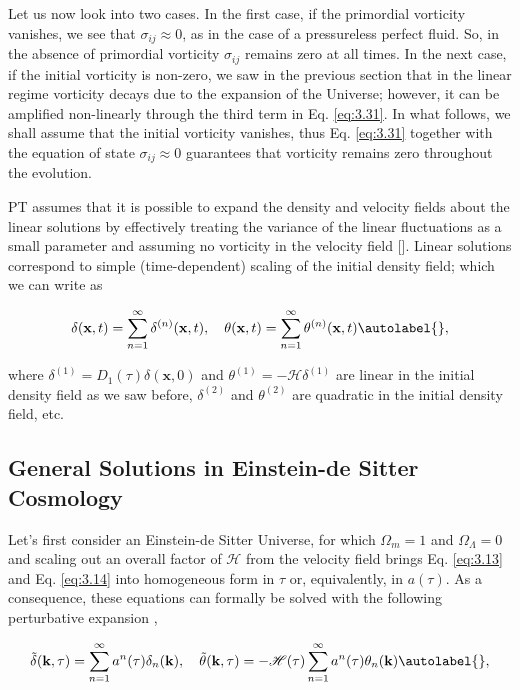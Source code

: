 Let us now look into two cases. In the first case, if the primordial vorticity vanishes, we see that $\sigma_{i j} \approx 0$, as in the case of a pressureless perfect fluid. So, in the absence of primordial vorticity $\sigma_{i j}$ remains zero at all times. In the next case, if the initial vorticity is non-zero, we saw in the previous section that in the linear regime vorticity decays due to the expansion of the Universe; however, it can be amplified non-linearly through the third term in Eq. \eqref{eq:3.31}. In what follows, we shall assume that the initial vorticity vanishes, thus Eq. \eqref{eq:3.31} together with the equation of state $\sigma_{i j} \approx 0$ guarantees that vorticity remains zero throughout the evolution.

PT assumes that it is possible to expand the density and velocity fields about the linear solutions by effectively treating the variance of the linear fluctuations as a small parameter and assuming no vorticity in the velocity field [\cite{Dodelson}\cite{Bernardeau_2002}]. Linear solutions correspond to simple (time-dependent) scaling of the initial density field; which we can write as

\begin{equation}
    \delta(\mathbf{x}, t)=\sum_{n=1}^{\infty} \delta^{(n)}(\mathbf{x}, t), \quad \theta(\mathbf{x}, t)=\sum_{n=1}^{\infty} \theta^{(n)}(\mathbf{x}, t) \autolabel{},
\end{equation}


where $\delta^{(1)}=D_{1}(\tau) \delta(\mathbf{x}, 0)$ and $\theta^{(1)} = -\mathcal{H}\delta^{(1)}$ are linear in the initial density field as we saw before, $\delta^{(2)}$ and $\theta^{(2)}$ are quadratic in the initial density field, etc.

\subsection{General Solutions in Einstein-de Sitter Cosmology}
Let's first consider an Einstein-de Sitter Universe, for which $\Omega_{m}=1$ and $\Omega_{\Lambda}=0$ and scaling out an overall factor of $\mathcal{H}$ from the velocity field brings Eq. \eqref{eq:3.13} and Eq. \eqref{eq:3.14} into homogeneous form in $\tau$ or, equivalently, in $a(\tau)$. As a consequence, these equations can formally be solved with the following perturbative expansion \cite{Goroff1986ApJ...311....6G, Jain_1994},


\begin{equation}
    \tilde{\delta}(\mathbf{k}, \tau)=\sum_{n=1}^{\infty} a^{n}(\tau) \delta_{n}(\mathbf{k}), \quad \tilde{\theta}(\mathbf{k}, \tau)=-\mathcal{H}(\tau) \sum_{n=1}^{\infty} a^{n}(\tau) \theta_{n}(\mathbf{k}) \autolabel{},
\end{equation}


